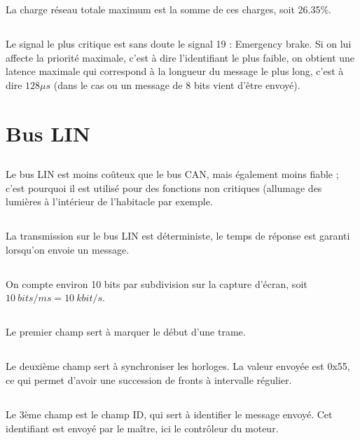 \documentclass[a4paper]{article}
\begin{document}
La charge réseau totale maximum est la somme de ces charges, soit 26.35\%.

\subsection{}
Le signal le plus critique est sans doute le signal 19 : Emergency brake. Si on lui affecte la priorité maximale, c'est à dire l'identifiant le plus faible, on obtient une latence maximale qui correspond à la longueur du message le plus long, c'est à dire $128\mu s$ (dans le cas ou un message de 8 bits vient d'être envoyé).

\section{Bus LIN}

\subsection{}
Le bus LIN est moins coûteux que le bus CAN, mais également moins fiable ; c'est pourquoi il est utilisé pour des fonctions non critiques (allumage des lumières à l'intérieur de l'habitacle par exemple.

\subsection{}
La transmission sur le bus LIN est déterministe, le temps de réponse est garanti lorsqu'on envoie un message.

\subsection{}
On compte environ 10 bits par subdivision sur la capture d'écran, soit $10~bits/ms = 10~kbit/s$.

\subsection{}
Le premier champ sert à marquer le début d'une trame.

\subsection{}
Le deuxième champ sert à synchroniser les horloges. La valeur envoyée est 0x55, ce qui permet d'avoir une succession de fronts à intervalle régulier.

\subsection{}
Le 3ème champ est le champ ID, qui sert à identifier le message envoyé. Cet identifiant est envoyé par le maître, ici le contrôleur du moteur.
\end{document}
